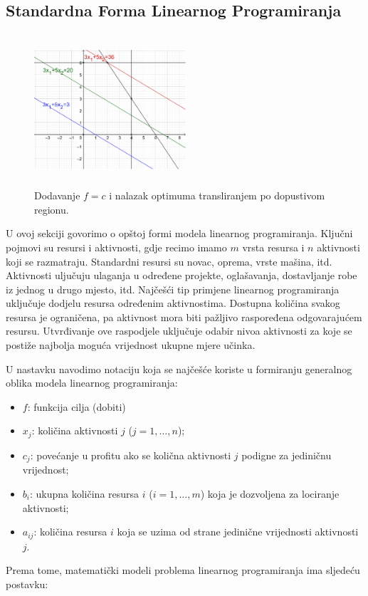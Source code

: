\documentclass[a4paper, utf8, 11pt, colorlinks]{article}
\begin{document}
\subsection{Standardna Forma Linearnog Programiranja}

\begin{figure}[!ht]
    \centering
    \includegraphics[width=160pt, height=160pt]{fig2.eps}
    \caption{Dodavanje $f = c$ i nalazak optimuma transliranjem po dopustivom regionu.}
    \label{fig:fig2}
\end{figure}

U ovoj sekciji govorimo o opštoj formi modela linearnog programiranja. 
Ključni pojmovi su resursi i aktivnosti, gdje recimo imamo $m$ vrsta resursa i $n$ aktivnosti koji se razmatraju. Standardni resursi su novac, oprema, vrste mašina, itd. Aktivnosti uljučuju ulaganja u određene projekte, oglašavanja, dostavljanje robe iz jednog u drugo mjesto, itd. 
 Najčešći tip primjene linearnog programiranja uključuje dodjelu resursa određenim aktivnostima. Dostupna količina svakog resursa je ograničena, pa aktivnost mora biti pažljivo raspoređena odgovarajućem resursu.  Utvrđivanje ove raspodjele uključuje odabir nivoa aktivnosti za koje se postiže
najbolja moguća vrijednost ukupne mjere učinka. 

U nastavku navodimo notaciju koja se najčešće koriste u formiranju generalnog oblika modela linearnog programiranja:

\begin{itemize}
    \item $f$: funkcija cilja (dobiti) 
    \item $x_j$: količina aktivnosti $j$ ($j = 1,\ldots,n$);
    \item $c_j$: povećanje u profitu ako se količna aktivnosti $j$ podigne za jediničnu vrijednost;
    \item $b_i$: ukupna količina resursa $i$ ($i=1,\ldots,m$) koja je dozvoljena za lociranje aktivnosti;
    \item $a_{ij}$: količina resursa $i$ koja se uzima od strane jedinične vrijednosti aktivnosti $j$.
\end{itemize}
Prema tome, matematički modeli problema linearnog programiranja ima sljedeću postavku:
\end{document}
